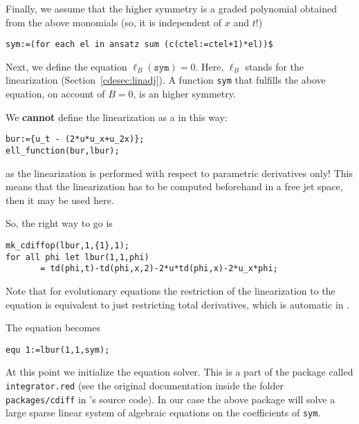 Finally, we assume that the higher symmetry is a graded polynomial obtained
from the above monomials (so, it is independent of $x$ and $t$!)
\begin{verbatim}
sym:=(for each el in ansatz sum (c(ctel:=ctel+1)*el))$
\end{verbatim}
Next, we define the equation $\ell_B(\mathtt{sym})=0$. Here, $\ell_B$ stands
for the linearization (Section~\ref{cdesec:linadj}). A function
\texttt{sym} that fulfills the above equation, on account of $B=0$, is an higher
symmetry.

We \textbf{cannot} define the linearization as a \cdiffop in this way:
\begin{verbatim}
bur:={u_t - (2*u*u_x+u_2x)};
ell_function(bur,lbur);
\end{verbatim}
as the linearization is performed with respect to parametric derivatives only!
This means that the linearization has to be computed beforehand in a free jet
space, then it may be used here.

So, the right way to go is
\begin{verbatim}
mk_cdiffop(lbur,1,{1},1);
for all phi let lbur(1,1,phi)
       = td(phi,t)-td(phi,x,2)-2*u*td(phi,x)-2*u_x*phi;
\end{verbatim}
Note that for evolutionary equations the restriction of the linearization to
the equation is equivalent to just restricting total
derivatives, which is automatic in \cde.

The equation becomes
\begin{verbatim}
equ 1:=lbur(1,1,sym);
\end{verbatim}
At this point we initialize the equation solver. This is a part of the \cdiff
package called \texttt{integrator.red} (see the original documentation inside
the folder \texttt{packages/cdiff} in \REDUCE's source code). In our case the
above package will solve a large sparse linear system of algebraic equations on
the coefficients of \texttt{sym}.

